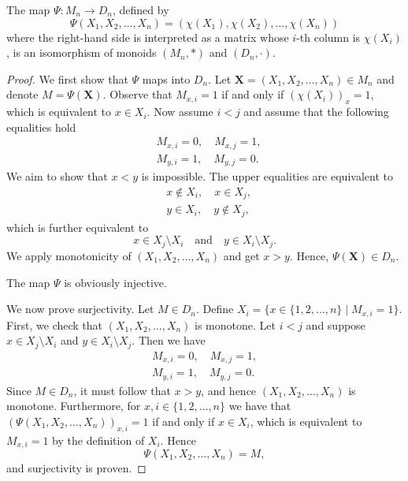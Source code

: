 \documentclass[10pt,a4paper]{amsart}
\begin{document}
\begin{theorem}\label{thm:Psi}
   The map $\Psi : M_n \rightarrow D_n$, defined by
   \[
      \Psi(X_1, X_2, \dots, X_n) = (\chi(X_1), \chi(X_2), \dots, \chi(X_n))
   \]
   where the right-hand side is interpreted as a matrix whose $i$-th column is $\chi(X_i)$, is an isomorphism of monoids $(M_n, \ast)$ and $(D_n, \cdot)$.
\end{theorem}

\begin{proof}
   We first show that $\Psi$ maps into $D_n$. Let $\mathbf{X} = (X_1, X_2, \dots, X_n) \in M_n$ and denote $M = \Psi(\mathbf{X})$.
   Observe that $M_{x, i} = 1$ if and only if $(\chi(X_i))_x = 1$, which is equivalent to $x \in X_i$.
   Now assume $i < j$ and assume that the following equalities hold
   \begin{align*}
      &M_{x, i} = 0, \quad M_{x, j} = 1, \\
      &M_{y, i} = 1, \quad M_{y, j} = 0.
   \end{align*}
   We aim to show that $x < y$ is impossible. 
   The upper equalities are equivalent to 
   \begin{align*}
      &x \notin X_i, \quad x \in X_j, \\
      &y \in X_i, \quad y \notin X_j, 
   \end{align*}
   which is further equivalent to 
   \[ 
      x \in X_j \setminus X_i \quad \text{and} \quad y \in X_i \setminus X_j. 
   \]
   We apply monotonicity of $(X_1, X_2, \dots, X_n)$ and get $x>y$. Hence, $\Psi(\mathbf{X}) \in D_n$.



   The map $\Psi$ is obviously injective.

   We now prove surjectivity. Let $M \in D_n$. Define $X_i = \{x \in \{1, 2, \dots, n\} \mid M_{x, i} = 1\}$. First, we check that $(X_1, X_2, \dots, X_n)$ is monotone.
   Let $i < j$ and suppose $x \in X_j \setminus X_i$ and $y \in X_i \setminus X_j$. Then we have
   \begin{align*}
      M_{x, i} = 0, \quad M_{x, j} = 1, \\
      M_{y, i} = 1, \quad M_{y, j} = 0.
   \end{align*}
   Since $M \in D_n$, it must follow that $x>y$, and hence $(X_1, X_2, \dots, X_n)$ is monotone.
   Furthermore, for $x, i \in \{1, 2, \dots, n\}$ we have that $(\Psi(X_1, X_2, \dots, X_n))_{x, i} = 1$ if and only if $x \in X_i$, which is equivalent to  $M_{x, i} = 1$ by the definition of $X_i$.
   Hence
   \[
   \Psi(X_1, X_2, \dots, X_n) = M,
   \]
   and surjectivity is proven. 



\end{proof}
\end{document}
